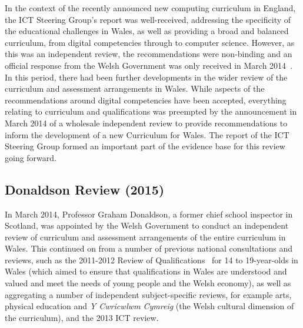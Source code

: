 \documentclass{sig-alternate}
\begin{document}

In the context of the recently announced new computing curriculum in
England, the ICT Steering Group's report was well-received, addressing
the specificity of the educational challenges in Wales, as well as
providing a broad and balanced curriculum, from digital competencies
through to computer science. However, as this was an independent
review, the recommendations were non-binding and an official response
from the Welsh Government was only received in March
2014~\cite{wgictresponse:2014}. In this period, there had been further
developments in the wider review of the curriculum and assessment
arrangements in Wales. While aspects of the recommendations around
digital competencies have been accepted, everything relating to
curriculum and qualifications was preempted by the announcement
in March 2014 of a wholesale independent review to provide
recommendations to inform the development of a new Curriculum for
Wales. The report of the ICT Steering Group formed an important
part of the evidence base for this review going forward.

\subsection{Donaldson Review (2015)}

In March 2014, Professor Graham Donaldson, a former chief school
inspector in Scotland, was appointed by the Welsh Government to
conduct an independent review of curriculum and assessment
arrangements of the entire curriculum in Wales.  This continued on
from a number of previous national consultations and reviews, such as
the 2011-2012 Review of Qualifications~\cite{wgrev14-19:2014} for 14
to 19-year-olds in Wales (which aimed to ensure that qualifications in
Wales are understood and valued and meet the needs of young people and
the Welsh economy), as well as aggregating a number of independent
subject-specific reviews, for example arts, physical education and
{\emph{Y Cwricwlwm Cymreig}} (the Welsh cultural dimension of the
curriculum), and the 2013 ICT review.
\end{document}
